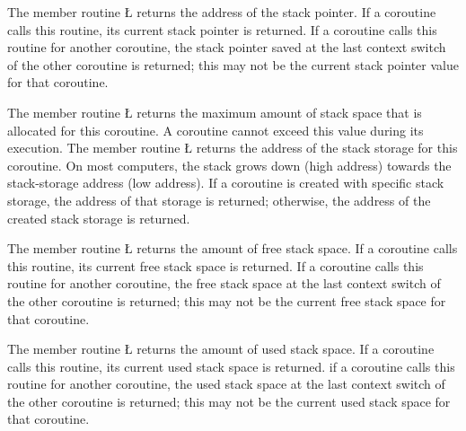 \documentclass[openright,twoside]{report}
\begin{document}
The member routine \LGinlinetrue\LGbegin\lgrinde\L{}\endlgrinde\LGend{} returns the address of the stack pointer.
If a coroutine calls this routine, its current stack pointer is returned.
If a coroutine calls this routine for another coroutine, the stack pointer saved at the last context switch of the other coroutine is returned;
this may not be the current stack pointer value for that coroutine.

The member routine \LGinlinetrue\LGbegin\lgrinde\L{}\endlgrinde\LGend{} returns the maximum amount of stack space that is allocated for this coroutine.
A coroutine cannot exceed this value during its execution.
The member routine \LGinlinetrue\LGbegin\lgrinde\L{}\endlgrinde\LGend{} returns the address of the stack storage for this coroutine.
On most computers, the stack grows down (high address) towards the stack-storage address (low address).
If a coroutine is created with specific stack storage, the address of that storage is returned;
otherwise, the address of the \uC created stack storage is returned.

The member routine \LGinlinetrue\LGbegin\lgrinde\L{}\endlgrinde\LGend{} returns the amount of free stack space.
If a coroutine calls this routine, its current free stack space is returned.
If a coroutine calls this routine for another coroutine, the free stack space at the last context switch of the other coroutine is returned;
this may not be the current free stack space for that coroutine.

The member routine \LGinlinetrue\LGbegin\lgrinde\L{}\endlgrinde\LGend{} returns the amount of used stack space.
If a coroutine calls this routine, its current used stack space is returned.
if a coroutine calls this routine for another coroutine, the used stack space at the last context switch of the other coroutine is returned;
this may not be the current used stack space for that coroutine.
\end{document}
